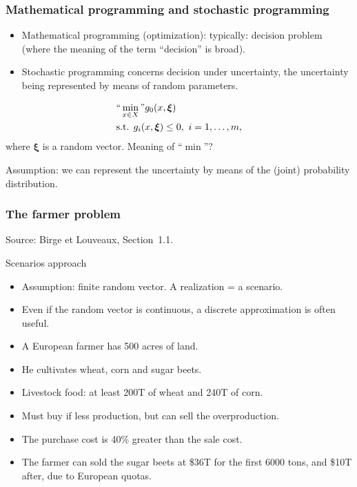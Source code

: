 \documentclass{beamer}
\def\bxi{\boldsymbol\xi}
\def\blue{\color{blue}}
\def\red{\color{red}}
\begin{document}
\begin{frame}
\frametitle{Mathematical programming and stochastic programming}

\begin{itemize}
\item
{\red Mathematical programming} (optimization): typically: decision problem (where the meaning of the term ``decision'' is broad).
\item
{\red Stochastic programming} concerns decision under uncertainty, the uncertainty being represented by means of random parameters.
\end{itemize}
\[
\begin{split}
& ``\min_{x \in X}" g_0(x,\bxi) \\
& \text{s.t. }g_i(x, \bxi) \leq 0,\ i=1,\ldots{},m,\\
\end{split}
\]
where $\bxi$ is a random vector. Meaning of ``$\min$''?

\mbox{}

{\red Assumption}: we can represent the uncertainty by means of the (joint) probability distribution.

\end{frame}

\begin{frame}
\frametitle{The farmer problem}

Source: Birge et Louveaux, Section~1.1.

\mbox{}

{\blue Scenarios approach}
\begin{itemize}
\item
Assumption: finite random vector. A realization = a scenario.
\item
Even if the random vector is continuous, a discrete approximation is often useful.
\end{itemize}

\mbox{}

\begin{itemize}
\item
A European farmer has 500 acres of land.
\item
He cultivates wheat, corn and sugar beets.
\item
Livestock food: at least 200T of wheat and 240T of corn.
\item
Must buy if less production, but can sell the overproduction.
\item
The purchase cost is 40\% greater than the sale cost.
\item
The farmer can sold the sugar beets at \$36T for the first 6000 tons, and \$10T after, due to European quotas.
\end{itemize}

\end{frame}
\end{document}

